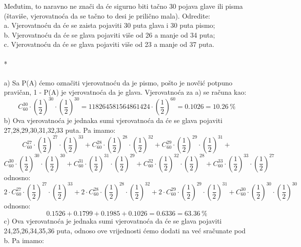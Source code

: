 \documentclass[12pt]{article}
\begin{document}
\begin{enumerate}
Međutim, to naravno ne znači da će sigurno biti tačno 30 pojava glave ili pisma
(štaviše, vjerovatnoća da se tačno to desi je prilično mala). Odredite: \\
a. Vjerovatnoću da će se zaista pojaviti 30 puta glava i 30 puta pismo; \\
b. Vjerovatnoću da će se glava pojaviti više od 26 a manje od 34 puta; \\
c. Vjerovatnoću da će se glava pojaviti više od 23 a manje od 37 puta. \\
\\
* \\
\\
a) Sa P(A) ćemo označiti vjerovatnoću da je pismo, pošto je novčić
potpuno pravičan, 1 - P(A) je vjerovatnoća da je glava. Vjerovatnoća
za a) se računa kao:
\begin{equation*}
        C^{30}_{60} \cdot (\frac{1}{2})^{30} \cdot (\frac{1}{2})^{30} = 118264581564861424 \cdot (\frac{1}{2})^{60}
        =0.1026 = 10.26~\%
\end{equation*}	
\newpage
b) Ova vjerovatnoća je jednaka sumi vjerovatnoća da će se glava pojaviti
27,28,29,30,31,32,33 puta. Pa imamo:
\begin{equation*}
        C^{27}_{60} \cdot (\frac{1}{2})^{27} \cdot (\frac{1}{2})^{33} +
        C^{28}_{60} \cdot (\frac{1}{2})^{28} \cdot (\frac{1}{2})^{32} +
        C^{29}_{60} \cdot (\frac{1}{2})^{29} \cdot (\frac{1}{2})^{31} +
\end{equation*}	
\begin{equation*}
        C^{30}_{60} \cdot (\frac{1}{2})^{30} \cdot (\frac{1}{2})^{30} +
        C^{31}_{60} \cdot (\frac{1}{2})^{31} \cdot (\frac{1}{2})^{29} +
        C^{32}_{60} \cdot (\frac{1}{2})^{32} \cdot (\frac{1}{2})^{28} +
        C^{33}_{60} \cdot (\frac{1}{2})^{33} \cdot (\frac{1}{2})^{27} 
\end{equation*}	
odnosno:
\begin{equation*}
        2 \cdot C^{27}_{60} \cdot (\frac{1}{2})^{27} \cdot (\frac{1}{2})^{33} +
        2 \cdot C^{28}_{60} \cdot (\frac{1}{2})^{28} \cdot (\frac{1}{2})^{32} +
        2 \cdot C^{29}_{60} \cdot (\frac{1}{2})^{29} \cdot (\frac{1}{2})^{31} +
        C^{30}_{60} \cdot (\frac{1}{2})^{30} \cdot (\frac{1}{2})^{30}
\end{equation*}	
odnosno:
\begin{equation*}
        0.1526 + 0.1799 + 0.1985 + 0.1026 = 0.6336 = 63.36~\%
\end{equation*}	
c) Ova vjerovatnoća je jednaka sumi vjerovatnoća da će se glava pojaviti 24,25,26,34,35,36 puta, odnoso ove vrijednosti ćemo dodati na već sračunate pod b. Pa imamo:

\end{enumerate}
\end{document}
